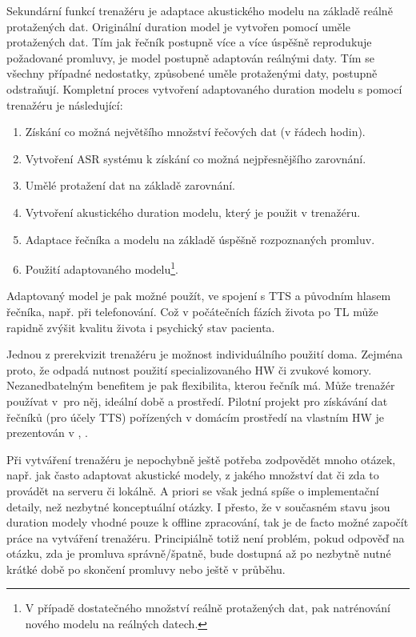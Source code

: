 Sekundární funkcí trenažéru je adaptace akustického modelu na základě reálně protažených dat. Originální duration model je vytvořen pomocí uměle protažených dat. Tím jak řečník postupně více a více úspěšně reprodukuje požadované promluvy, je model postupně adaptován reálnými daty. Tím se všechny případné nedostatky, způsobené uměle protaženými daty, postupně odstraňují. Kompletní proces vytvoření adaptovaného duration modelu s pomocí trenažéru je následující:

\begin{enumerate}
  \item Získání co možná největšího množství řečových dat (v řádech hodin).
  \item Vytvoření ASR systému k získání co možná nejpřesnějšího zarovnání.
  \item Umělé protažení dat na základě zarovnání.
  \item Vytvoření akustického duration modelu, který je použit v trenažéru.
  \item Adaptace řečníka a modelu na základě úspěšně rozpoznaných promluv.
  \item Použití adaptovaného modelu\footnote{V případě dostatečného množství reálně protažených dat, pak natrénování nového modelu na reálných datech.}.
\end{enumerate}

\noindent Adaptovaný model je pak možné použít, ve spojení s TTS a původním hlasem řečníka, např. při telefonování. Což v počátečních fázích života po TL může rapidně zvýšit kvalitu života i psychický stav pacienta. \cite{Mertl2018}

Jednou z prerekvizit trenažéru je možnost individuálního použití doma. Zejména proto, že odpadá nutnost použití specializovaného HW  či zvukové komory. Nezanedbatelným benefitem je pak flexibilita, kterou řečník má. Může trenažér používat v~pro něj, ideální době a prostředí. Pilotní projekt pro získávání dat řečníků (pro účely TTS) pořízených v domácím prostředí na vlastním HW je prezentován v \cite{Juzova2015}, \cite{Juzova2017}.

Při vytváření trenažéru je nepochybně ještě potřeba zodpovědět mnoho otázek,  např. jak často adaptovat akustické modely, z jakého množství dat či zda to provádět na serveru či lokálně. A priori se však jedná spíše o implementační detaily, než nezbytné konceptuální otázky. I přesto, že v současném stavu jsou duration modely vhodné pouze k offline zpracování, tak je de facto možné započít práce na vytváření trenažéru. Principiálně totiž není problém, pokud odpověď na otázku, zda je promluva správně/špatně, bude dostupná až po nezbytně nutné krátké době po skončení promluvy nebo ještě v průběhu.


